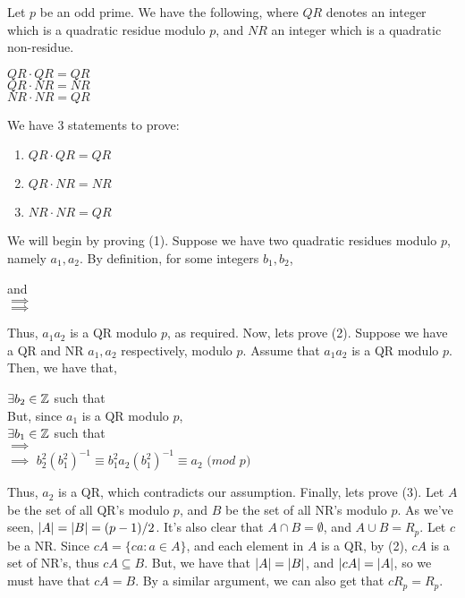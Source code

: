 \documentclass[../main.tex]{subfiles}
\begin{document}
\begin{thm}
    Let $p$ be an odd prime. We have the following, where $QR$ denotes an integer which is a quadratic residue modulo $p$, and $NR$ an integer which is a quadratic non-residue.
    \begin{center}
        $QR \cdot QR = QR$ \\
        $QR \cdot NR = NR$ \\
        $NR \cdot NR = QR$
    \end{center}
\end{thm}
\begin{pf}
    We have 3 statements to prove:
    \begin{enumerate}
        \item $QR \cdot QR = QR$
        \item $QR \cdot NR = NR$
        \item $NR \cdot NR = QR$
    \end{enumerate}
    We will begin by proving (1).
    Suppose we have two quadratic residues modulo $p$, namely $a_1,a_2$. By definition, for some integers $b_1,b_2$,
    \begin{center}
         and  \\
        $\implies$  \\
        $\implies$ 
    \end{center}
    Thus, $a_1a_2$ is a QR modulo $p$, as required. \sspace
    Now, lets prove (2).
    Suppose we have a QR and NR $a_1,a_2$ respectively, modulo $p$. Assume that $a_1a_2$ is a QR modulo $p$. Then, we have that,
    \begin{center}
        $\exists b_2 \in \mathbb{Z}$ such that  \\
        But, since $a_1$ is a QR modulo $p$, \\
        $\exists b_1 \in \mathbb{Z}$ such that  \\
        $\implies$  \\
        $\implies$ $b_2^2(b_1^2)^{-1} \equiv b_1^2a_2(b_1^2)^{-1} \equiv a_2$ $(mod$ $p)$
    \end{center}
    Thus, $a_2$ is a QR, which contradicts our assumption. \sspace
    Finally, lets prove (3).
    Let $A$ be the set of all QR's modulo $p$, and $B$ be the set of all NR's modulo $p$. As we've seen, $\abs{A}=\abs{B}=(p-1)/2$. It's also clear that $A \cap B=\emptyset$, and $A \cup B=R_p$. Let $c$ be a NR. Since $cA=\{ca:a\in A\}$, and each element in $A$ is a QR, by (2), $cA$ is a set of NR's, thus $cA \subseteq B$. But, we have that $\abs{A}=\abs{B}$, and $\abs{cA}=\abs{A}$, so we must have that $cA=B$. By a similar argument, we can also get that $cR_p=R_p$.

\end{pf}
\end{document}
